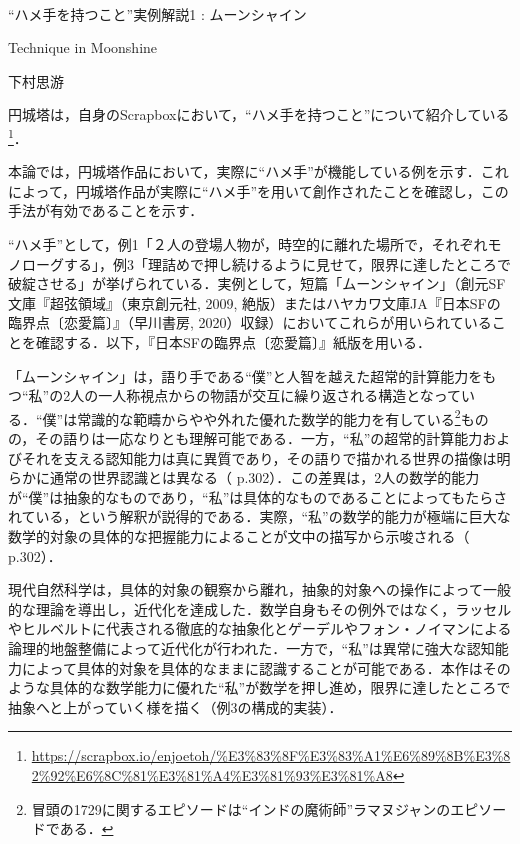 \documentclass[10pt, a5paper, twoside]{jsarticle}
\theoremstyle{definition}
\begin{document}
	~ %

	\begin{center}

		\Large{“ハメ手を持つこと”実例解説1 : ムーンシャイン}

		\vspace{3mm}

		\large{Technique in Moonshine}

		\vspace{3mm}
		
		\large{下村思游}

	\end{center}

	\vspace{3mm}

		円城塔は，自身のScrapboxにおいて，“ハメ手を持つこと”について紹介している\footnote{\url{https://scrapbox.io/enjoetoh/%E3%83%8F%E3%83%A1%E6%89%8B%E3%82%92%E6%8C%81%E3%81%A4%E3%81%93%E3%81%A8}}．

		本論では，円城塔作品において，実際に“ハメ手”が機能している例を示す．これによって，円城塔作品が実際に“ハメ手”を用いて創作されたことを確認し，この手法が有効であることを示す．

		“ハメ手”として，例1「２人の登場人物が，時空的に離れた場所で，それぞれモノローグする」，例3「理詰めで押し続けるように見せて，限界に達したところで破綻させる」が挙げられている．実例として，短篇「ムーンシャイン」（創元SF文庫『超弦領域』（東京創元社, 2009, 絶版）またはハヤカワ文庫JA『日本SFの臨界点〔恋愛篇〕』（早川書房, 2020）収録）においてこれらが用いられていることを確認する．以下，『日本SFの臨界点〔恋愛篇〕』紙版を用いる．

		「ムーンシャイン」は，語り手である“僕”と人智を越えた超常的計算能力をもつ“私”の2人の一人称視点からの物語が交互に繰り返される構造となっている．“僕”は常識的な範疇からやや外れた優れた数学的能力を有している\footnote{冒頭の1729に関するエピソードは“インドの魔術師”ラマヌジャンのエピソードである．}ものの，その語りは一応なりとも理解可能である．一方，“私”の超常的計算能力およびそれを支える認知能力は真に異質であり，その語りで描かれる世界の描像は明らかに通常の世界認識とは異なる（\cite{moon} p.302）．この差異は，2人の数学的能力が“僕”は抽象的なものであり，“私”は具体的なものであることによってもたらされている，という解釈が説得的である．実際，“私”の数学的能力が極端に巨大な数学的対象の具体的な把握能力によることが文中の描写から示唆される（\cite{moon} p.302）．

		現代自然科学は，具体的対象の観察から離れ，抽象的対象への操作によって一般的な理論を導出し，近代化を達成した．数学自身もその例外ではなく，ラッセルやヒルベルトに代表される徹底的な抽象化とゲーデルやフォン・ノイマンによる論理的地盤整備によって近代化が行われた．一方で，“私”は異常に強大な認知能力によって具体的対象を具体的なままに認識することが可能である．本作はそのような具体的な数学能力に優れた“私”が数学を押し進め，限界に達したところで抽象へと上がっていく様を描く（例3の構成的実装）．
\end{document}
